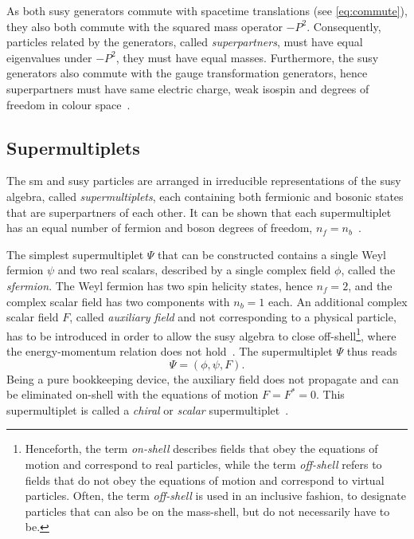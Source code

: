 As both \gls{susy} generators commute with spacetime translations (see \cref{eq:commute}), they also both commute with the squared mass operator $-P^2$. Consequently, particles related by the generators, called \textit{superpartners}, must have equal eigenvalues under $-P^2$, \ie they must have equal masses. Furthermore, the \gls{susy} generators also commute with the gauge transformation generators, hence superpartners must have same electric charge, weak isospin and degrees of freedom in colour space~\cite{Martin:1997ns}.


\subsection{Supermultiplets}\label{sec:supermultiplets}

The \gls{sm} and \gls{susy} particles are arranged in irreducible representations of the \gls{susy} algebra, called \textit{supermultiplets}, each containing both fermionic and bosonic states that are superpartners of each other. It can be shown that each supermultiplet has an equal number of fermion and boson degrees of freedom, $n_f = n_b$~\cite{Martin:1997ns}.

The simplest supermultiplet $\Psi$ that can be constructed contains a single Weyl fermion $\psi$ and two real scalars, described by a single complex field $\phi$, called the \textit{sfermion}. The Weyl fermion has two spin helicity states, hence $n_f=2$, and the complex scalar field has two components with $n_b=1$ each. An additional complex scalar field $F$, called \textit{auxiliary field} and not corresponding to a physical particle, has to be introduced in order to allow the \gls{susy} algebra to close off-shell\footnote{Henceforth, the term \textit{on-shell} describes fields that obey the equations of motion and correspond to real particles, while the term \textit{off-shell} refers to fields that do not obey the equations of motion and correspond to virtual particles. Often, the term \textit{off-shell} is used in an inclusive fashion, \ie to designate particles that can also be on the mass-shell, but do not necessarily have to be.}, where the energy-momentum relation does not hold~\cite{Martin:1997ns}. The supermultiplet $\Psi$ thus reads
\begin{equation}
	\Psi = (\phi,\psi,F).
\end{equation}
Being a pure bookkeeping device, the auxiliary field does not propagate and can be eliminated on-shell with the equations of motion $F=F^*=0$. This supermultiplet is called a \textit{chiral} or \textit{scalar} supermultiplet~\cite{Martin:1997ns}. 

